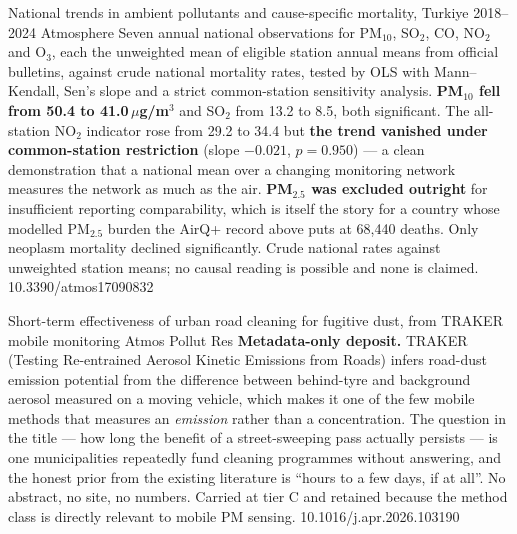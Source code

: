 \documentclass[10pt]{article}
\begin{document}
{National trends in ambient pollutants and cause-specific mortality, Turkiye 2018--2024}
{Atmosphere}
{Seven annual national observations for PM$_{10}$, SO$_2$, CO, NO$_2$ and O$_3$, each the
unweighted mean of eligible station annual means from official bulletins, against crude
national mortality rates, tested by OLS with Mann--Kendall, Sen's slope and a
strict common-station sensitivity analysis. \textbf{PM$_{10}$ fell from 50.4 to
41.0\,$\mu$g/m$^3$} and SO$_2$ from 13.2 to 8.5, both significant. The all-station NO$_2$
indicator rose from 29.2 to 34.4 but \textbf{the trend vanished under common-station
restriction} (slope $-0.021$, $p = 0.950$) --- a clean demonstration that a national mean
over a changing monitoring network measures the network as much as the air.
\textbf{PM$_{2.5}$ was excluded outright} for insufficient reporting comparability, which
is itself the story for a country whose modelled PM$_{2.5}$ burden the AirQ+ record above
puts at 68{,}440 deaths. Only neoplasm mortality declined significantly. Crude national
rates against unweighted station means; no causal reading is possible and none is claimed.}
{10.3390/atmos17090832}

{Short-term effectiveness of urban road cleaning for fugitive dust, from TRAKER mobile monitoring}
{Atmos Pollut Res}
{\textbf{Metadata-only deposit.} TRAKER (Testing Re-entrained Aerosol Kinetic Emissions
from Roads) infers road-dust emission potential from the difference between behind-tyre
and background aerosol measured on a moving vehicle, which makes it one of the few
mobile methods that measures an \emph{emission} rather than a concentration. The question
in the title --- how long the benefit of a street-sweeping pass actually persists --- is
one municipalities repeatedly fund cleaning programmes without answering, and the honest
prior from the existing literature is ``hours to a few days, if at all''. No abstract, no
site, no numbers. Carried at tier C and retained because the method class is directly
relevant to mobile PM sensing.}
{10.1016/j.apr.2026.103190}

\end{document}
